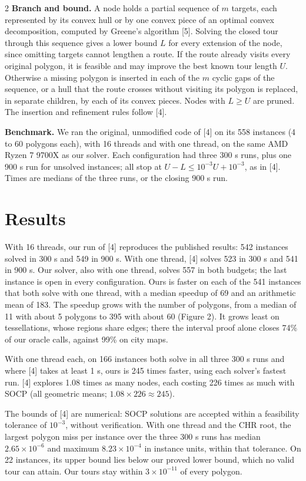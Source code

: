 \documentclass[10pt,a4paper]{article}
\begin{document}
\begin{multicols}{2}
\textbf{Branch and bound.} A node holds a partial sequence of \(m\) targets, each represented by its convex hull or by one convex piece of an optimal convex decomposition, computed by Greene's algorithm [5]. Solving the closed tour through this sequence gives a lower bound \(L\) for every extension of the node, since omitting targets cannot lengthen a route. If the route already visits every original polygon, it is feasible and may improve the best known tour length \(U\). Otherwise a missing polygon is inserted in each of the \(m\) cyclic gaps of the sequence, or a hull that the route crosses without visiting its polygon is replaced, in separate children, by each of its convex pieces. Nodes with \(L\ge U\) are pruned. The insertion and refinement rules follow [4].

\textbf{Benchmark.} We ran the original, unmodified code of [4] on its 558 instances (4 to 60 polygons each), with 16 threads and with one thread, on the same AMD Ryzen 7 9700X as our solver. Each configuration had three 300 s runs, plus one 900 s run for unsolved instances; all stop at \(U-L\le10^{-3}U+10^{-3}\), as in [4]. Times are medians of the three runs, or the closing 900 s run.

\section{Results}

With 16 threads, our run of [4] reproduces the published results: 542 instances solved in 300 s and 549 in 900 s. With one thread, [4] solves 523 in 300 s and 541 in 900 s. Our solver, also with one thread, solves 557 in both budgets; the last instance is open in every configuration. Ours is faster on each of the 541 instances that both solve with one thread, with a median speedup of 69 and an arithmetic mean of 183. The speedup grows with the number of polygons, from a median of 11 with about 5 polygons to 395 with about 60 (Figure 2). It grows least on tessellations, whose regions share edges; there the interval proof alone closes 74\% of our oracle calls, against 99\% on city maps.

With one thread each, on 166 instances both solve in all three 300 s runs and where [4] takes at least 1 s, ours is 245 times faster, using each solver's fastest run. [4] explores 1.08 times as many nodes, each costing 226 times as much with SOCP (all geometric means; \(1.08\times226\approx245\)).

The bounds of [4] are numerical: SOCP solutions are accepted within a feasibility tolerance of \(10^{-3}\), without verification. With one thread and the CHR root, the largest polygon miss per instance over the three 300 s runs has median \(2.65\times10^{-6}\) and maximum \(8.23\times10^{-4}\) in instance units, within that tolerance. On 22 instances, its upper bound lies below our proved lower bound, which no valid tour can attain. Our tours stay within \(3\times10^{-11}\) of every polygon.


\end{multicols}
\end{document}
